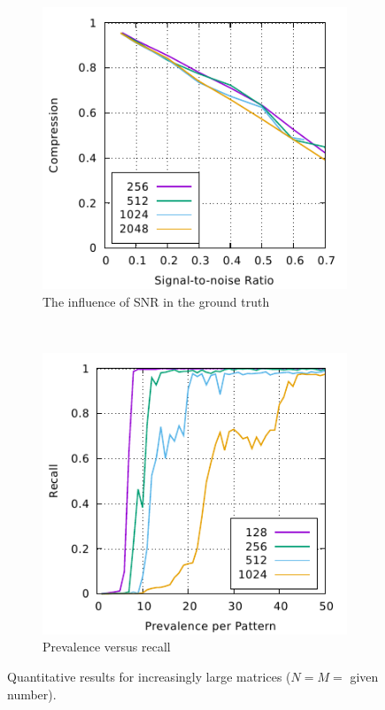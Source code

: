 \documentclass{llncs}
\begin{document}


\begin{figure}[p]%
	\begin{subfigure}[t]{0.5\textwidth}
	\includegraphics[scale=1]{figures/experiments-gnuplottex-fig1.pdf}
	\caption{The influence of SNR in the ground truth}
	\label{fig:snr}

	\end{subfigure}%
	~
	\begin{subfigure}[t]{0.5\textwidth}
	\includegraphics[scale=1]{figures/experiments-gnuplottex-fig2.pdf}
	\caption{Prevalence versus recall}
	\label{fig:usage}
	\end{subfigure}
	\caption{Quantitative results for increasingly large matrices ($N=M=$ given number).}
	\label{fig:plots}
\end{figure}
\end{document}
